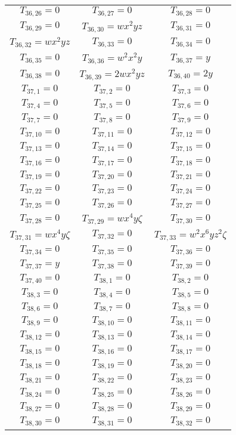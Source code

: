 \begin{longtable}{|c|c|c|}
$T_{36,26}= 0$&
$T_{36,27}= 0$&
$T_{36,28}= 0$\\
$T_{36,29}= 0$&
$T_{36,30}= wx^2yz$&
$T_{36,31}= 0$\\
$T_{36,32}= wx^2yz$&
$T_{36,33}= 0$&
$T_{36,34}= 0$\\
$T_{36,35}= 0$&
$T_{36,36}= w^2x^2y$&
$T_{36,37}= y$\\
$T_{36,38}= 0$&
$T_{36,39}= 2wx^2yz$&
$T_{36,40}= 2y$\\
$T_{37,1}= 0$&
$T_{37,2}= 0$&
$T_{37,3}= 0$\\
$T_{37,4}= 0$&
$T_{37,5}= 0$&
$T_{37,6}= 0$\\
$T_{37,7}= 0$&
$T_{37,8}= 0$&
$T_{37,9}= 0$\\
$T_{37,10}= 0$&
$T_{37,11}= 0$&
$T_{37,12}= 0$\\
$T_{37,13}= 0$&
$T_{37,14}= 0$&
$T_{37,15}= 0$\\
$T_{37,16}= 0$&
$T_{37,17}= 0$&
$T_{37,18}= 0$\\
$T_{37,19}= 0$&
$T_{37,20}= 0$&
$T_{37,21}= 0$\\
$T_{37,22}= 0$&
$T_{37,23}= 0$&
$T_{37,24}= 0$\\
$T_{37,25}= 0$&
$T_{37,26}= 0$&
$T_{37,27}= 0$\\
$T_{37,28}= 0$&
$T_{37,29}= wx^4y\zeta$&
$T_{37,30}= 0$\\
$T_{37,31}= wx^4y\zeta$&
$T_{37,32}= 0$&
$T_{37,33}= w^2x^6yz^2\zeta$\\
$T_{37,34}= 0$&
$T_{37,35}= 0$&
$T_{37,36}= 0$\\
$T_{37,37}= y$&
$T_{37,38}= 0$&
$T_{37,39}= 0$\\
$T_{37,40}= 0$&
$T_{38,1}= 0$&
$T_{38,2}= 0$\\
$T_{38,3}= 0$&
$T_{38,4}= 0$&
$T_{38,5}= 0$\\
$T_{38,6}= 0$&
$T_{38,7}= 0$&
$T_{38,8}= 0$\\
$T_{38,9}= 0$&
$T_{38,10}= 0$&
$T_{38,11}= 0$\\
$T_{38,12}= 0$&
$T_{38,13}= 0$&
$T_{38,14}= 0$\\
$T_{38,15}= 0$&
$T_{38,16}= 0$&
$T_{38,17}= 0$\\
$T_{38,18}= 0$&
$T_{38,19}= 0$&
$T_{38,20}= 0$\\
$T_{38,21}= 0$&
$T_{38,22}= 0$&
$T_{38,23}= 0$\\
$T_{38,24}= 0$&
$T_{38,25}= 0$&
$T_{38,26}= 0$\\
$T_{38,27}= 0$&
$T_{38,28}= 0$&
$T_{38,29}= 0$\\
$T_{38,30}= 0$&
$T_{38,31}= 0$&
$T_{38,32}= 0$\\

\end{longtable}

